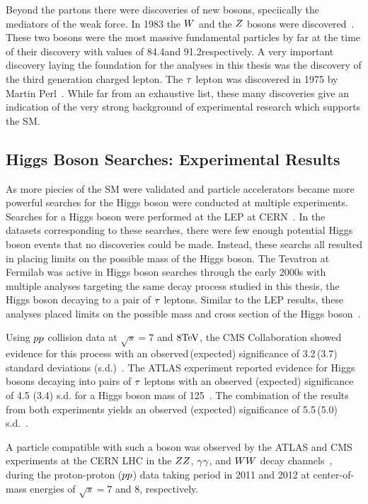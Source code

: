 Beyond the partons there were discoveries of new bosons, speciically the mediators
of the weak force.
In 1983 the $W$ and the $Z$ bosons were discovered~\cite{AUBERT1983275,1983398}. 
These two bosons were the
most massive fundamental particles by far at the time of their discovery with values of
84.4\GeV and 91.2\GeV respectively.
A very important discovery laying the foundation for the analyses in this thesis was
the discovery of the third generation charged lepton. The $\tau$ lepton was discovered
in 1975 by Martin Perl~\cite{PhysRevLett.35.1489}. While far from an exhaustive list,
these many discoveries give an indication of the very strong background of experimental
research which supports the SM.

\subsection{Higgs Boson Searches: Experimental Results}
As more piecies of the SM were validated and particle accelerators became more powerful
searches for the Higgs boson were conducted at multiple experiments.
Searches for a Higgs boson were performed at the 
LEP at CERN~\cite{Barate:2000ts,Abdallah:2003ip,Achard:2001pj,Abbiendi:2000ac}.
In the datasets corresponding to these searches, there were few enough potential Higgs
boson events that no discoveries could be made.
Instead, these searchs all resulted in placing limits on the possible mass of the Higgs boson.
The Tevatron at Fermilab was active in Higgs boson searches through the early 2000s
with multiple analyses targeting the same decay process studied in this thesis, the Higgs
boson decaying to a pair of $\tau$ leptons. Similar to the LEP results, these analyses
placed limits on the possible mass and cross section of the Higgs boson~\cite{Aaltonen:2012jh, Abazov:2012zj}.


Using $pp$ collision data at $\sqrt{s}=7$ and $8\mathrm{TeV}$, the CMS Collaboration showed evidence for this process with an observed\,(expected)
significance of 3.2\,(3.7) standard deviations (s.d.)~\cite{Chatrchyan:2014nva}. The ATLAS
experiment reported evidence for Higgs bosons decaying into pairs
of $\tau$ leptons with an observed (expected) significance of 4.5 (3.4)
s.d. for a Higgs boson mass of 125\GeV~\cite{Aad:2015vsa}.
The combination of the results from both experiments yields an observed (expected)
significance of 5.5\,(5.0) s.d.~\cite{Khachatryan:2016vau}.


A particle compatible with such a boson was observed by the ATLAS and CMS experiments at the CERN LHC
in the $ZZ$, $\gamma \gamma$, and $WW$ decay channels~\cite{Aad:2012tfa, Chatrchyan:2012xdj, Chatrchyan:2013lba},
during the proton-proton ($pp$) data taking period in 2011 and 2012
at center-of-mass energies of $\sqrt{s} = 7$ and 8\TeV, respectively.

